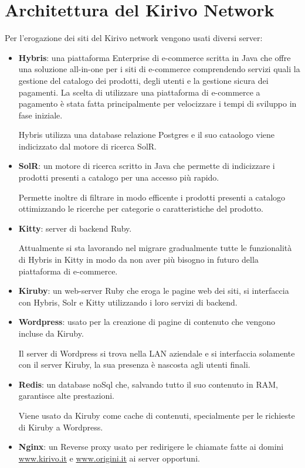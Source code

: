 \section{Architettura del Kirivo Network}
Per l'erogazione dei siti del Kirivo network vengono usati diversi server:
\begin{itemize}
\item {\bf Hybris}: una piattaforma Enterprise di e-commerce scritta in Java che offre una soluzione all-in-one per i siti 
di e-commerce comprendendo servizi quali la gestione del catalogo dei prodotti, degli utenti e la 
gestione sicura dei pagamenti. La scelta di utilizzare una piattaforma di e-commerce a pagamento è stata fatta
principalmente per velocizzare i tempi di sviluppo in fase iniziale.

Hybris utilizza una database relazione Postgres e il suo cataologo viene indicizzato dal motore di ricerca SolR.

\item {\bf SolR}: un motore di ricerca scritto in Java che permette di indicizzare i prodotti presenti a catalogo per una accesso
più rapido.

Permette inoltre di filtrare in modo efficente i prodotti presenti a catalogo ottimizzando
le ricerche per categorie o caratteristiche del prodotto.
\item {\bf Kitty}: server di backend Ruby.

Attualmente si sta lavorando nel migrare gradualmente tutte le funzionalità
di Hybris in Kitty in modo da non aver più bisogno in futuro della piattaforma di e-commerce.
\item {\bf Kiruby}: un web-server Ruby che eroga le pagine web dei siti, si interfaccia con Hybris, Solr e Kitty utilizzando i loro
servizi di backend. 
\item {\bf Wordpress}: usato per la creazione di pagine di contenuto che vengono incluse da Kiruby.

Il server di Wordpress si trova nella LAN aziendale e si interfaccia solamente con il server Kiruby, la sua
presenza è nascosta agli utenti finali.
\item {\bf Redis}: un database noSql che, salvando tutto il suo contenuto in RAM, garantisce alte prestazioni.

Viene usato da Kiruby come cache di contenuti, specialmente per le richieste di Kiruby a Wordpress.

\item {\bf Nginx}: un Reverse proxy usato per redirigere le chiamate fatte ai domini \url{www.kirivo.it} 
e \url{www.origini.it} ai server opportuni.
\end{itemize}

